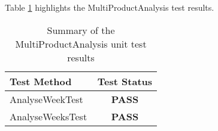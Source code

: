 Table \ref{tab:multiproduct_analysis_test} highlights the MultiProductAnalysis 
test results.

\begin{table}[h]
  \centering
  \begin{tabular}{|l|c|}
    \hline
    {\bfseries Test Method} & {\bfseries Test Status} \\ 
    \hline
    AnalyseWeekTest         & {\bfseries \color{OliveGreen} PASS} \\ 
    AnalyseWeeksTest        & {\bfseries \color{OliveGreen} PASS} \\
    \hline
  \end{tabular}
  \caption[Summary of the MultiProductAnalysis unit test results]
          {Summary of the MultiProductAnalysis unit test results}
  \label{tab:multiproduct_analysis_test}
\end{table}
